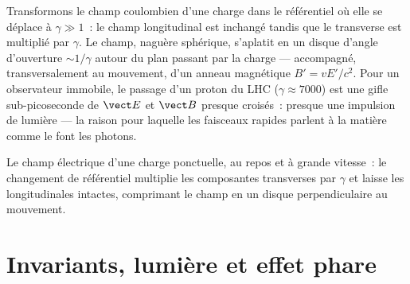 \begin{example}\label{ex:b3:covariant-electromagnetism:pancake}
Transformons le champ coulombien d'une charge dans le référentiel où
elle se déplace à $\gamma \gg 1$~: le champ longitudinal est inchangé
tandis que le transverse est multiplié par $\gamma$. Le champ,
naguère sphérique, s'aplatit en un disque d'angle d'ouverture
$\sim 1/\gamma$ autour du plan passant par la charge --- accompagné,
transversalement au mouvement, d'un anneau magnétique $B' = vE'/c^2$.
Pour un observateur immobile, le passage d'un proton du LHC
($\gamma \approx 7000$) est une gifle sub-picoseconde de $\vect E$ et
$\vect B$ presque croisés~: presque une impulsion de lumière --- la
raison pour laquelle les faisceaux rapides parlent à la matière comme
le font les photons.
\end{example}

\begin{omfigure}

{\small Le champ électrique d'une charge ponctuelle, au repos et à
grande vitesse~: le changement de référentiel multiplie les
composantes transverses par $\gamma$ et laisse les longitudinales
intactes, comprimant le champ en un disque perpendiculaire au
mouvement.}
\end{omfigure}

\section{Invariants, lumière et effet phare}

